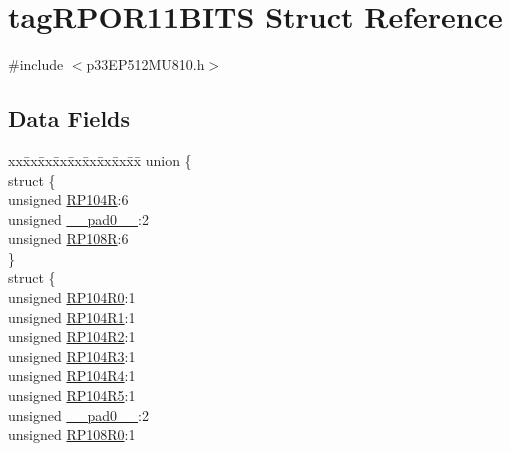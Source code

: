 \hypertarget{structtag_r_p_o_r11_b_i_t_s}{}\section{tag\+R\+P\+O\+R11\+B\+I\+TS Struct Reference}
\label{structtag_r_p_o_r11_b_i_t_s}


{\ttfamily \#include $<$p33\+E\+P512\+M\+U810.\+h$>$}

\subsection*{Data Fields}
\begin{DoxyCompactItemize}
\item 
\begin{tabbing}
xx\=xx\=xx\=xx\=xx\=xx\=xx\=xx\=xx\=\kill
union \{\\
\>struct \{\\
\>\>unsigned \hyperlink{structtag_r_p_o_r11_b_i_t_s_aca1448ab10287f9a31a5e5db9c6b42d1}{RP104R}:6\\
\>\>unsigned \hyperlink{structtag_r_p_o_r11_b_i_t_s_adf71f3d8410c1f1dbbc96680a92c49af}{\_\_pad0\_\_}:2\\
\>\>unsigned \hyperlink{structtag_r_p_o_r11_b_i_t_s_ab2527ab587bb74e817c09689d66719e1}{RP108R}:6\\
\>\} \\
\>struct \{\\
\>\>unsigned \hyperlink{structtag_r_p_o_r11_b_i_t_s_a312169d4696bdd814657cb399949bd49}{RP104R0}:1\\
\>\>unsigned \hyperlink{structtag_r_p_o_r11_b_i_t_s_a26284e436d8e31c27f208be3a3439db5}{RP104R1}:1\\
\>\>unsigned \hyperlink{structtag_r_p_o_r11_b_i_t_s_a3262e153c03285791e443c8655d62982}{RP104R2}:1\\
\>\>unsigned \hyperlink{structtag_r_p_o_r11_b_i_t_s_ad2e12cc096eb908d0dd78f1ad5dbdacf}{RP104R3}:1\\
\>\>unsigned \hyperlink{structtag_r_p_o_r11_b_i_t_s_a8880c0473cc0d94eca0b8d96aa6b4420}{RP104R4}:1\\
\>\>unsigned \hyperlink{structtag_r_p_o_r11_b_i_t_s_a79e02beacdc8f14b1bbc4209f583174a}{RP104R5}:1\\
\>\>unsigned \hyperlink{structtag_r_p_o_r11_b_i_t_s_adf71f3d8410c1f1dbbc96680a92c49af}{\_\_pad0\_\_}:2\\
\>\>unsigned \hyperlink{structtag_r_p_o_r11_b_i_t_s_a775eb4b4cc1c3b2491994e2a21137fe3}{RP108R0}:1\\

\end{tabbing}
\end{DoxyCompactItemize}
